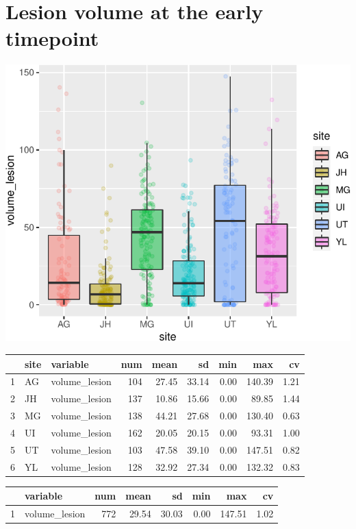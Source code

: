 \documentclass[
]{article}
\begin{document}
\hypertarget{lesion-volume-at-the-early-timepoint}{%
\section{Lesion volume at the early
timepoint}\label{lesion-volume-at-the-early-timepoint}}

\begin{center}\includegraphics{paper_files/figure-latex/plot_lesion_early-1} \end{center}

\begin{table}[ht]
\centering
\begin{tabular}{rllrrrrrr}
  \hline
 & site & variable & num & mean & sd & min & max & cv \\ 
  \hline
1 & AG & volume\_lesion & 104 & 27.45 & 33.14 & 0.00 & 140.39 & 1.21 \\ 
  2 & JH & volume\_lesion & 137 & 10.86 & 15.66 & 0.00 & 89.85 & 1.44 \\ 
  3 & MG & volume\_lesion & 138 & 44.21 & 27.68 & 0.00 & 130.40 & 0.63 \\ 
  4 & UI & volume\_lesion & 162 & 20.05 & 20.15 & 0.00 & 93.31 & 1.00 \\ 
  5 & UT & volume\_lesion & 103 & 47.58 & 39.10 & 0.00 & 147.51 & 0.82 \\ 
  6 & YL & volume\_lesion & 128 & 32.92 & 27.34 & 0.00 & 132.32 & 0.83 \\ 
   \hline
\end{tabular}
\end{table}
\begin{table}[ht]
\centering
\begin{tabular}{rlrrrrrr}
  \hline
 & variable & num & mean & sd & min & max & cv \\ 
  \hline
1 & volume\_lesion & 772 & 29.54 & 30.03 & 0.00 & 147.51 & 1.02 \\ 
   \hline
\end{tabular}
\end{table}
\end{document}
